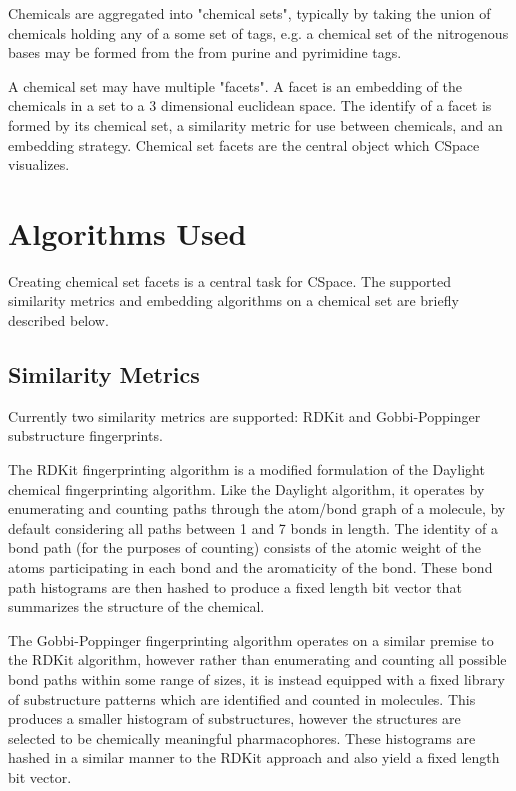 \documentclass[12pt]{article}
\begin{document}
Chemicals are aggregated into "chemical sets", typically by taking the union of chemicals holding any of a some set of tags, e.g. a chemical set of the nitrogenous bases may be formed from the from purine and pyrimidine tags.

A chemical set may have multiple "facets". A facet is an embedding of the chemicals in a set to a 3 dimensional euclidean space. The identify of a facet is formed by its chemical set, a similarity metric for use between chemicals, and an embedding strategy. Chemical set facets are the central object which CSpace visualizes.

\section{Algorithms Used}
Creating chemical set facets is a central task for CSpace. The supported similarity metrics and embedding algorithms on a chemical set are briefly described below.

\subsection{Similarity Metrics}
Currently two similarity metrics are supported: RDKit and Gobbi-Poppinger substructure fingerprints.

The RDKit fingerprinting algorithm\cite{landrum_2007} is a modified formulation of the Daylight chemical fingerprinting algorithm\cite{daylighttheorymanual_2019}. Like the Daylight algorithm, it operates by enumerating and counting paths through the atom/bond graph of a molecule, by default considering all paths between 1 and 7 bonds in length. The identity of a bond path (for the purposes of counting) consists of the atomic weight of the atoms participating in each bond and the aromaticity of the bond. These bond path histograms are then hashed to produce a fixed length bit vector that summarizes the structure of the chemical.

The Gobbi-Poppinger fingerprinting algorithm\cite{Gobbi1998} operates on a similar premise to the RDKit algorithm, however rather than enumerating and counting all possible bond paths within some range of sizes, it is instead equipped with a fixed library of substructure patterns which are identified and counted in molecules. This produces a smaller histogram of substructures, however the structures are selected to be chemically meaningful pharmacophores. These histograms are hashed in a similar manner to the RDKit approach and also yield a fixed length bit vector.
\end{document}
